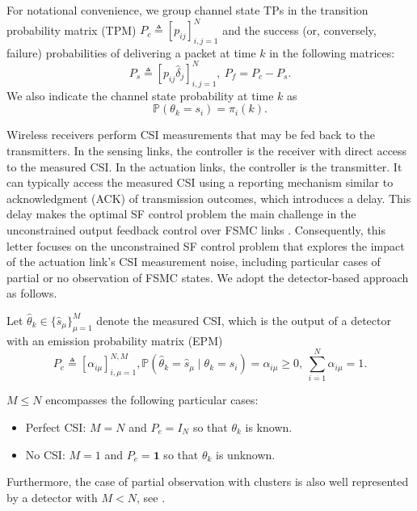 \documentclass[journal,twoside,web]{ieeecolor}
\begin{document}
For notational convenience, we group
channel state TPs in the transition probability matrix (TPM) $P_{c}^{} \triangleq \left[p_{ij}\right]_{i,j=1}^{N}$
and the  success (or, conversely, failure) probabilities of delivering a packet at time $k$ in the following matrices:
\begin{equation}\label{eq:Ps}
    P_{s}^{} \triangleq \left[p_{ij}\hat{\delta}_{j}\right]_{i,j=1}^{N},~P_{f} = P_{c} - P_{s}.
\end{equation}
We also indicate the channel state probability at time $k$ as
\begin{equation}\label{eq:pik}
     \mathbb{P}(\theta_{k} = s_i) = \pi_{i}(k).
\end{equation}

Wireless receivers perform CSI measurements that may be fed back to the transmitters. In the sensing links, the controller is the receiver with direct access to the measured CSI. In the actuation links, the controller is the transmitter. It can typically access the measured CSI using a reporting mechanism similar to acknowledgment (ACK) of transmission outcomes, which introduces a delay. This delay makes the optimal SF control problem the main challenge in the unconstrained output feedback control over FSMC links \cite{impicciatore2024tac}. Consequently, this letter focuses on the unconstrained SF control problem that explores the impact of the actuation link's CSI measurement noise, including particular cases of partial or no observation of FSMC states. We adopt the detector-based approach as follows.

Let $\hat{\theta}_k \in \{\hat{s}_{\mu}\}_{\mu=1}^{M}$ denote the measured CSI, which is the output of a detector with an emission probability matrix (EPM)
\begin{subequations}
\begin{equation}\label{eq:epm}
    P_{e}^{} \triangleq \left[\alpha_{i\mu}\right]_{i,\mu=1}^{N,M},
\end{equation}
\begin{equation}\label{eq:alpha}
   \mathbb{P}(\hat{\theta}_{k} = \hat{s}_{\mu} \mid \theta_{k} = s_i) = \alpha_{i\mu} \geq 0,~ \sum_{i=1}^N \alpha_{i\mu}= 1.
\end{equation}
\end{subequations}

$M\leq N$ encompasses the following particular cases:
\begin{itemize}
    \item Perfect CSI: $M=N$ and $P_e = I_N$ so that %
    $\theta_k$ is known.
    \item No CSI: $M=1$ and $P_e = \mathbf{1}$ so that $\theta_k$ is unknown.
\end{itemize}
Furthermore, the case of partial observation with clusters is also well represented by a detector with $M<N$, see \cite{costa2015detector}.
\end{document}
